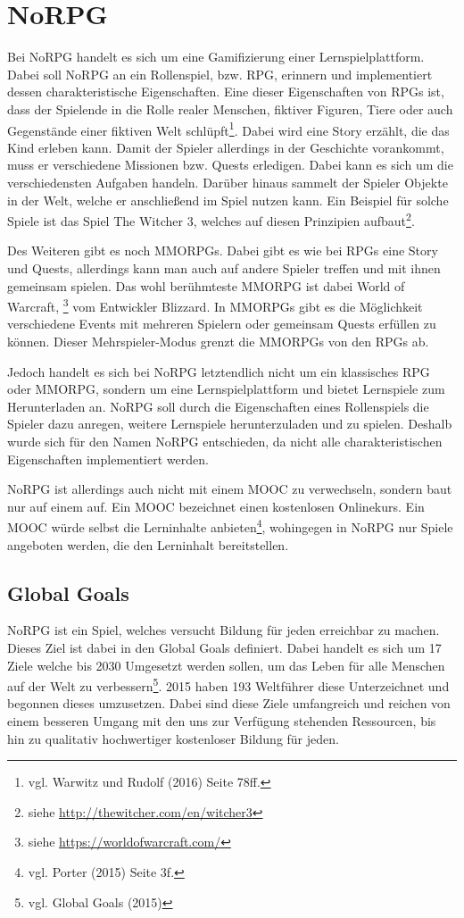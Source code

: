 \chapter{NoRPG}		
Bei NoRPG handelt es sich um eine Gamifizierung einer Lernspielplattform. Dabei soll NoRPG an ein Rollenspiel, bzw. \acf{RPG}, erinnern und implementiert dessen charakteristische Eigenschaften. Eine dieser Eigenschaften von \acsp{RPG} ist, dass der Spielende in die Rolle realer Menschen, fiktiver Figuren, Tiere oder auch Gegenstände einer fiktiven Welt schlüpft\footnote{vgl. Warwitz und Rudolf \cite{rpgSinn} (2016) Seite 78ff.}. Dabei wird eine Story erzählt, die das Kind erleben kann. Damit der Spieler allerdings in der Geschichte vorankommt, muss er verschiedene Missionen bzw. Quests erledigen. Dabei kann es sich um die verschiedensten Aufgaben handeln. Darüber hinaus sammelt der Spieler Objekte in der Welt, welche er anschließend im Spiel nutzen kann. Ein Beispiel für solche Spiele ist das Spiel The Witcher 3, welches auf diesen Prinzipien aufbaut\footnote{siehe \url{http://thewitcher.com/en/witcher3}}.
	
Des Weiteren gibt es noch \acfp{MMORPG}. Dabei gibt es wie bei \acsp{RPG} eine Story und Quests, allerdings kann man auch auf andere Spieler treffen und mit ihnen gemeinsam spielen. Das wohl berühmteste MMORPG ist dabei World of Warcraft, \footnote{siehe \url{https://worldofwarcraft.com/}} vom Entwickler Blizzard. In MMORPGs gibt es die Möglichkeit verschiedene Events mit mehreren Spielern oder gemeinsam Quests erfüllen zu können. Dieser Mehrspieler-Modus grenzt die \acsp{MMORPG} von den \acsp{RPG} ab.

Jedoch handelt es sich bei NoRPG letztendlich nicht um ein klassisches \ac{RPG} oder \ac{MMORPG}, sondern um eine Lernspielplattform und bietet Lernspiele zum Herunterladen an. NoRPG soll durch die Eigenschaften eines Rollenspiels die Spieler dazu anregen, weitere Lernspiele herunterzuladen und zu spielen. Deshalb wurde sich für den Namen NoRPG entschieden, da nicht alle charakteristischen Eigenschaften implementiert werden.

NoRPG ist allerdings auch nicht mit einem \acf{MOOC} zu verwechseln, sondern baut nur auf einem auf. Ein \ac{MOOC} bezeichnet einen kostenlosen Onlinekurs. Ein \ac{MOOC} würde selbst die Lerninhalte anbieten\footnote{vgl. Porter \cite{moocBook} (2015) Seite 3f.}, wohingegen in NoRPG nur Spiele angeboten werden, die den Lerninhalt bereitstellen.

\section{Global Goals}
NoRPG ist ein Spiel, welches versucht Bildung für jeden erreichbar zu machen. Dieses Ziel ist dabei in den Global Goals definiert. Dabei handelt es sich um 17 Ziele welche bis 2030 Umgesetzt werden sollen, um das Leben für alle Menschen auf der Welt zu verbessern\footnote{vgl. Global Goals \cite{global} (2015)}. 2015 haben 193 Weltführer diese Unterzeichnet und begonnen dieses umzusetzen. Dabei sind diese Ziele umfangreich und reichen von einem besseren Umgang mit den uns zur Verfügung stehenden Ressourcen, bis hin zu qualitativ hochwertiger kostenloser Bildung für jeden.

